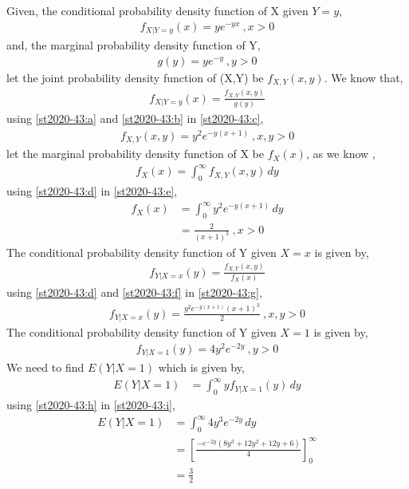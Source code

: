 Given,
the conditional probability density function of X given $Y=y$,
\begin{align}
f_{X|Y=y}(x)=ye^{-yx} \:,x>0 \label{st2020-43:a}
\end{align}
and, the marginal probability density function of Y,
\begin{align}
g(y)=ye^{-y}\:,y>0 \label{st2020-43:b}
\end{align}
let the joint probability density function of (X,Y) be $f_{X,Y}(x,y)$.
We know that,
\begin{align}
f_{X|Y=y}(x)=\frac{f_{X,Y}(x,y)}{g(y)}  \label{st2020-43:c}
\end{align}
using \eqref{st2020-43:a} and \eqref{st2020-43:b} in \eqref{st2020-43:c},
\begin{align}
f_{X,Y}(x,y) =y^{2}e^{-y(x+1)} \:,x,y>0 \label{st2020-43:d}
\end{align}
let the marginal probability density function of X be $f_{X}(x)$,
as we know ,
\begin{align}
f_{X}(x)= \int_{0}^{\infty}{f_{X,Y}(x,y)}\,dy \label{st2020-43:e}
\end{align}
using \eqref{st2020-43:d} in \eqref{st2020-43:e},
\begin{align}
f_{X}(x) &=\int_{0}^{\infty}{y^{2}e^{-y(x+1)}}\,dy\\
&=\frac{2}{(x+1)^{3}} \:,x>0\label{st2020-43:f}
\end{align}
The conditional probability density function of Y given $X=x$ is given by,
\begin{align}
f_{Y|X=x}(y) =\frac{f_{X,Y}(x,y)}{f_{X}(x)} \label{st2020-43:g}
\end{align}
using \eqref{st2020-43:d} and \eqref{st2020-43:f} in \eqref{st2020-43:g},
\begin{align}
 f_{Y|X=x}(y) =\frac{y^{2}e^{-y(x+1)}(x+1)^{3}}{2} \:,x,y>0
\end{align}
The conditional probability density function of Y given $X=1$ is given by,
\begin{align}
 f_{Y|X=1}(y) =4y^{2}e^{-2y}  \:,y>0 \label{st2020-43:h}
\end{align}
We need to find $E(Y|X=1)$ which is given by,
\begin{align}
 E(Y|X=1) &= \int_{0}^{\infty}{yf_{Y|X=1}(y)}\,dy \label{st2020-43:i}
\end{align}
using \eqref{st2020-43:h} in \eqref{st2020-43:i},
\begin{align}
E(Y|X=1) &= \int_{0}^{\infty}{4y^{3}e^{-2y}}\,dy\\
  &= \left[\frac{-e^{-2y}(8y^{3} + 12y^{2} + 12y + 6)}{4}\right]_0^{\infty}\\
        &=\frac{3}{2}
\end{align}
